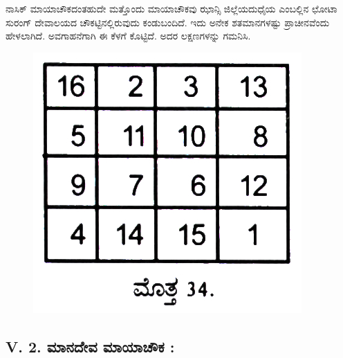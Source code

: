 ನಾಸಿಕ್ ಮಾಯಾಚೌಕದಂತಹುದೇ ಮತ್ತೊಂದು ಮಾಯಾಚೌಕವು ಝಾನ್ಸಿ ಜಿಲ್ಲೆಯ\break ದುಧೈಯ ಎಂಬಲ್ಲಿನ ಛೋಟಾ ಸುರಂಗ್ ದೇವಾಲಯದ ಚೌಕಟ್ಟಿನಲ್ಲಿರುವುದು ಕಂಡು\break ಬಂದಿದೆ. ಇದು ಅನೇಕ ಶತಮಾನಗಳಷ್ಟು ಪ್ರಾಚೀನವೆಂದು ಹೇಳಲಾಗಿದೆ. ಅವಗಾಹನೆ\-ಗಾಗಿ ಈ ಕೆಳಗೆ ಕೊಟ್ಟಿದೆ. ಅದರ ಲಕ್ಷಣಗಳನ್ನು ಗಮನಿಸಿ.
\begin{figure}[H]
\includegraphics[scale=.8]{src/figures/chap4/fig4.7.jpg}
\end{figure}

\subsection*{V. 2. ಮಾನದೇವ ಮಾಯಾಚೌಕ :}

